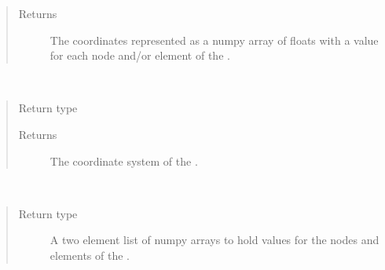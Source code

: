 \documentclass[letterpaper,10pt,english]{sphinxmanual}
\begin{document}
\begin{fulllineitems}
\begin{fulllineitems}
\begin{quote}
\begin{description}
\item[{Returns}] \leavevmode
The coordinates represented as a numpy array of floats
with a value for each node and/or element of the {\hyperref[\detokenize{mesh:ESMF.api.mesh.Mesh}]{}}
{\hyperref[\detokenize{mesh:ESMF.api.mesh.Mesh}]{}}.

\end{description}\end{quote}

\end{fulllineitems}


\begin{fulllineitems}
\label{\detokenize{mesh:ESMF.api.mesh.Mesh.coord_sys}}~\begin{quote}\begin{description}
\item[{Return type}] \leavevmode
{\hyperref[\detokenize{CoordSys:ESMF.api.constants.CoordSys}]{}}

\item[{Returns}] \leavevmode
The coordinate system of the {\hyperref[\detokenize{mesh:ESMF.api.mesh.Mesh}]{}}.

\end{description}\end{quote}

\end{fulllineitems}


\begin{fulllineitems}
\label{\detokenize{mesh:ESMF.api.mesh.Mesh.mask}}~\begin{quote}\begin{description}
\item[{Return type}] \leavevmode
A two element list of numpy arrays to hold values for the nodes
and elements of the {\hyperref[\detokenize{mesh:ESMF.api.mesh.Mesh}]{}}.


\end{description}
\end{quote}
\end{fulllineitems}
\end{fulllineitems}
\end{document}
